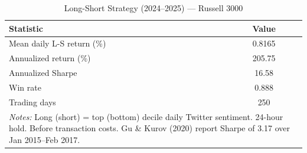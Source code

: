 \begin{table}[htbp]
\centering
\caption{Long-Short Strategy (2024--2025) --- Russell 3000}
\label{tab:russel_2024_t6}
\begin{tabular}{lc}
\hline\hline
Statistic & Value \\
\hline
Mean daily L-S return (\%) & 0.8165 \\
Annualized return (\%)     & 205.75 \\
Annualized Sharpe           & 16.58 \\
Win rate                    & 0.888 \\
Trading days                & 250 \\
\hline\hline
\multicolumn{2}{p{0.75\linewidth}}{\footnotesize \textit{Notes:} Long (short) = top (bottom) decile daily Twitter sentiment. 24-hour hold. Before transaction costs. Gu \& Kurov (2020) report Sharpe of 3.17 over Jan 2015--Feb 2017.}\n\end{tabular}
\end{table}